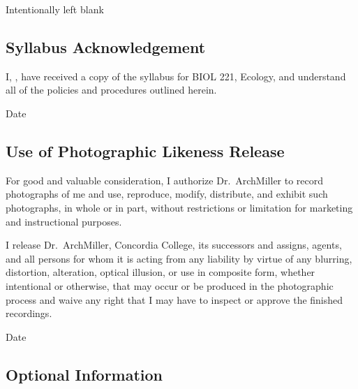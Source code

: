 \documentclass{tufte-handout}
\begin{document}
\newpage

Intentionally left blank

\newpage

\subsection{Syllabus Acknowledgement}

I, \underline{\hspace{5cm}}, have received a copy of the syllabus for BIOL 221, Ecology, and understand all of the policies and procedures outlined herein. 

  \underline{\hspace{5cm}} {Date}  \hrulefill


\subsection{Use of Photographic Likeness Release}

For good and valuable consideration, I authorize Dr.~ArchMiller to record photographs of me and use, reproduce, modify, distribute, and exhibit such photographs, in whole or in part, without restrictions or limitation for marketing and instructional purposes. 

I release Dr.~ArchMiller, Concordia College, its successors and assigns, agents, and all persons for whom it is acting from any liability by virtue of any blurring, distortion, alteration, optical illusion, or use in composite form, whether intentional or otherwise, that may occur or be produced in the photographic process and waive any right that I may have to inspect or approve the finished recordings.

  \hrulefill
{}  \underline{\hspace{5cm}} {Date}  \hrulefill

\subsection{Optional Information}

 \hrulefill

 \hrulefill

 \hrulefill

 \hrulefill


 \hrulefill

\hrulefill

\hrulefill

\hrulefill

\hrulefill

\hrulefill
\end{document}
